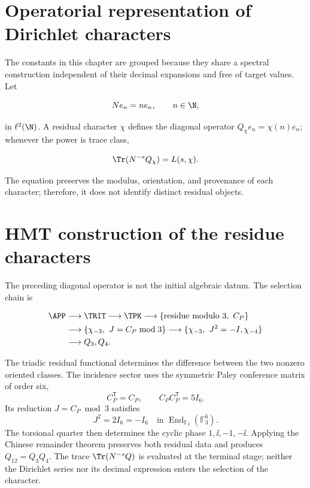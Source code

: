 \label{ch:spectral}

\section{Operatorial representation of Dirichlet characters}

The constants in this chapter are grouped because they share a spectral
construction independent of their decimal expansions and free of target
values. Let

\[
Ne_n=ne_n,\qquad n\in\N,
\]

in \(\ell^2(\N)\). A residual character \(\chi\) defines the diagonal operator \(Q_\chi e_n=\chi(n)e_n\); whenever the power is trace class,

\begin{equation}
\Tr(N^{-s}Q_\chi)=L(s,\chi).
\label{eq:L-trace}
\end{equation}

The equation preserves the modulus, orientation, and provenance of each
character; therefore, it does not identify distinct residual objects.

\section{HMT construction of the residue characters}

The preceding diagonal operator is not the initial algebraic datum. The
selection chain is

\[
\begin{aligned}
\APP&\longrightarrow\TRIT\longrightarrow\TPK
\longrightarrow\{\text{residue modulo }3,\ C_P\}\\
&\longrightarrow\{\chi_{-3},\ J=C_P\bmod3\}
\longrightarrow\{\chi_{-3},\ J^2=-I,\chi_{-4}\}\\
&\longrightarrow Q_3,Q_4.
\end{aligned}
\]

The triadic residual functional determines the difference between the two nonzero
oriented classes. The incidence sector uses the symmetric Paley conference
matrix of order six,
\[
C_P^{\mathsf T}=C_P,\qquad C_PC_P^{\mathsf T}=5I_6.
\]
Its reduction \(J=C_P\bmod3\) satisfies
\[
J^2=2I_6=-I_6
\quad\text{in }\operatorname{End}_{\mathbb F_3}(\mathbb F_3^6).
\]
The torsional quarter then determines the cyclic phase
\(1,\ii,-1,-\ii\). Applying the Chinese remainder theorem preserves
both residual data and produces \(Q_{12}=Q_3Q_4\). The trace
\(\Tr(N^{-s}Q)\) is evaluated at the terminal stage; neither the Dirichlet series
nor its decimal expression enters the selection of the character.

